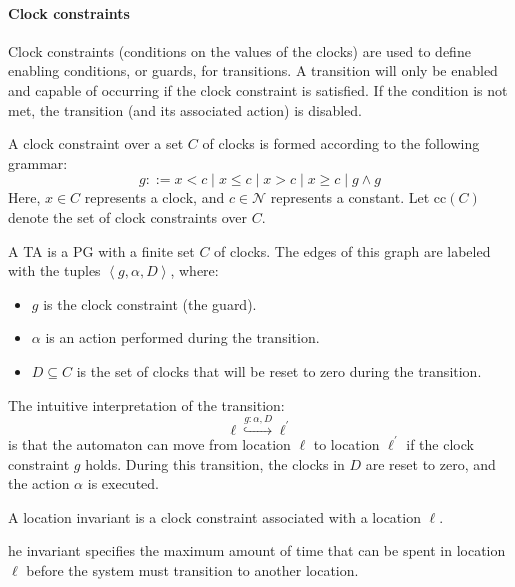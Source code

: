 \paragraph*{Clock constraints}
Clock constraints (conditions on the values of the clocks) are used to define enabling conditions, or guards, for transitions. 
A transition will only be enabled and capable of occurring if the clock constraint is satisfied. 
If the condition is not met, the transition (and its associated action) is disabled.
\begin{definition}
    A clock constraint over a set $C$ of clocks is formed according to the following grammar:
    \[g::=x<c\mid x\leq c\mid x>c \mid x\geq c\mid g\land g\]   
    Here, $x\in C$ represents a clock, and  $c\in\mathcal{N}$ represents a constant.
    Let $\text{cc}(C)$ denote the set of clock constraints over $C$.  
\end{definition}
\noindent A TA is a PG with a finite set $C$ of clocks.
The edges of this graph are labeled with the tuples $\left\langle g, \alpha, D\right\rangle$, where:
\begin{itemize}
    \item $g$ is the clock constraint (the guard).
    \item $\alpha$ is an action performed during the transition.
    \item $D\subseteq C$ is the set of clocks that will be reset to zero during the transition.
\end{itemize} 
\noindent The intuitive interpretation of the transition:
\[\ell\overset{g:\alpha,D}{\hookrightarrow}\ell^\prime\]
\noindent is that the automaton can move from location $\ell$ to location $\ell^\prime$ if the clock constraint $g$ holds. 
During this transition, the clocks in $D$ are reset to zero, and the action $\alpha$ is executed.
\begin{definition}
    A location invariant is a clock constraint associated with a location $\ell$. 
\end{definition}
\noindent he invariant specifies the maximum amount of time that can be spent in location $\ell$ before the system must transition to another location.

